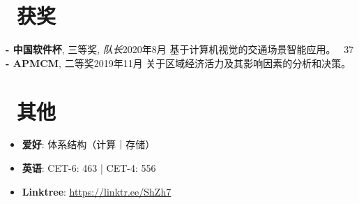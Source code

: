 \documentclass{common}
\begin{document}
\vspace{0.85ex}

\section{\faTrophy\ 获奖}
\award
    {\textbf{- 中国软件杯}, 三等奖, \textit{队长}}{2020年8月}
    {基于计算机视觉的交通场景智能应用。 
        {\href{https://github.com/Sh-Zh-7/intelligent-transportation-system}{\underline{\faGithub}} \faStarO\ 37}
    }
\vspace{0.5ex}
\award
    {\textbf{- APMCM}, 二等奖}{2019年11月}
    {关于区域经济活力及其影响因素的分析和决策。}

\vspace{0.85ex}

\section{\faInfo\ 其他}
\begin{itemize}[parsep=0.5ex]
    \item \textbf{爱好}: 体系结构（计算｜存储）
    \item \textbf{英语}: CET-6: 463 | CET-4: 556
    \item \textbf{Linktree}: \href{https://linktr.ee/ShZh7}{\underline{https://linktr.ee/ShZh7}}
\end{itemize}
\end{document}
